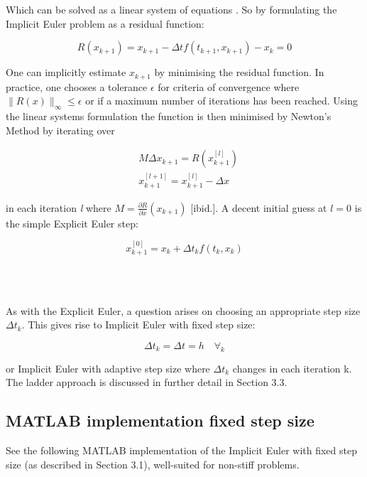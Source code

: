 Which can be solved as a linear system of equations \cite{JrgensenScientificEquationsb}. So by formulating the Implicit Euler problem as a residual function: 

\begin{equation}
R\left(x_{k+1}\right)=x_{k+1}-\Delta t f\left(t_{k+1}, x_{k+1}\right)-x_{k}=0
\end{equation}

One can implicitly estimate $x_{k+1}$ by minimising the residual function. In practice, one chooses a tolerance $\epsilon$ for criteria of convergence where $\|R(x)\|_{\infty} \leq \epsilon$ or if a maximum number of iterations has been reached. Using the linear systems formulation the function is then minimised by Newton's Method by iterating over

$$
\begin{aligned}
&M \Delta x_{k+1}=R\left(x_{k+1}^{[l]}\right) \\
&x_{k+1}^{[l+1]}=x_{k+1}^{[l]}-\Delta x
\end{aligned}
$$

in each iteration \textit{l} where $M=\frac{\partial R}{\partial x}\left(x_{k+1}\right)$ [ibid.]. A decent initial guess at $l=0$ is the simple Explicit Euler step:

$$
x_{k+1}^{[0]}=x_{k}+\Delta t_k f\left(t_{k}, x_{k}\right)
$$

\\\

As with the Explicit Euler, a question arises on choosing an appropriate step size $\Delta t_k$. This gives rise to Implicit Euler with fixed step size:

\begin{equation*}
    \Delta t_k = \Delta t = h \quad \forall_k
\end{equation*}

or Implicit Euler with adaptive step size where $\Delta t_k$ changes in each iteration k. The ladder approach is discussed in further detail in Section 3.3.













\subsection{MATLAB implementation fixed step size}
See the following MATLAB implementation of the Implicit Euler with fixed step size (as described in Section 3.1), well-suited for non-stiff problems.


